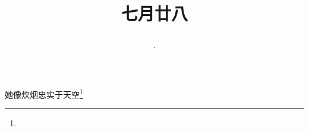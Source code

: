 \title{\date[d=31,m=8,y=2024][year:cn-y,年,month:cn,day:cn,日,·,weekday]·七月廿八 }
她像炊烟忠实于天空\footnote{ }

